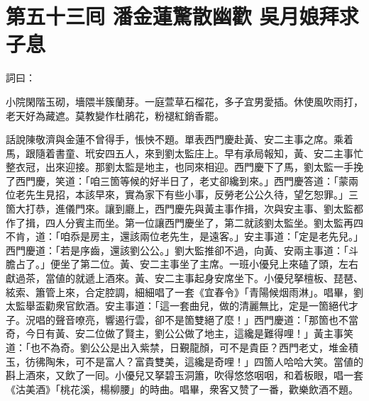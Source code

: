 
\chapter*{第五十三囘 潘金蓮驚散幽歡 吳月娘拜求子息}


詞曰：

\begin{myquote}
小院閑階玉砌，墻隈半簇蘭芽。一庭萱草石榴花，多子宜男愛插。休使風吹雨打，老天好為藏遮。莫教變作杜鵑花，粉褪紅銷香罷。

\end{myquote}

話說陳敬濟與金蓮不曾得手，悵怏不題。單表西門慶赴黃、安二主事之席。乘着馬，跟隨着書童、玳安四五人，來到劉太監庄上。早有承局報知，黃、安二主事忙整衣冠，出來迎接。那劉太監是地主，也同來相迎。西門慶下了馬，劉太監一手挽了西門慶，笑道：「咱三箇等候的好半日了，老丈卻纔到來。」西門慶答道：「蒙兩位老先生見招，本該早來，實為家下有些小事，反勞老公公久待，望乞恕罪。」三箇大打恭，進儀門來。讓到廳上，西門慶先與黃主事作揖，次與安主事、劉太監都作了揖，四人分賓主而坐。第一位讓西門慶坐了，第二就該劉太監坐。劉太監再四不肯，道：「咱忝是房主，還該兩位老先生，是遠客。」安主事道：「定是老先兒。」西門慶道：「若是序齒，還該劉公公。」劉大監推卻不過，向黃、安兩主事道：「斗膽占了。」便坐了第二位。黃、安二主事坐了主席。一班小優兒上來磕了頭，左右獻過茶，當値的就遞上酒來。黃、安二主事起身安席坐下。小優兒拏檀板、琵琶、絃索、簫管上來，合定腔調，細細唱了一套《宜春令》「青陽候烟雨淋」。唱畢，劉太監舉盃勸衆官飲酒。安主事道：「這一套曲兒，做的清麗無比，定是一箇絕代才子。況唱的聲音嘹亮，響遏行雲，卻不是箇雙絕了麼！」西門慶道：「那箇也不當奇，今日有黃、安二位做了賢主，劉公公做了地主，這纔是難得哩！」黃主事笑道：「也不為奇。劉公公是出入紫禁，日覲龍顏，可不是貴臣？西門老丈，堆金積玉，彷彿陶朱，可不是富人？富貴雙美，這纔是奇哩！」{}四箇人哈哈大笑。當値的斟上酒來，又飲了一囘。小優兒又拏碧玉洞簫，吹得悠悠咽咽，和着板眼，唱一套《沽美酒》「桃花溪，楊柳腰」的時曲。唱畢，衆客又赞了一番，歡樂飲酒不題。


